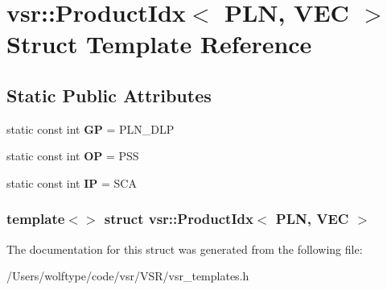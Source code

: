 \hypertarget{structvsr_1_1_product_idx_3_01_p_l_n_00_01_v_e_c_01_4}{\section{vsr\-:\-:Product\-Idx$<$ P\-L\-N, V\-E\-C $>$ Struct Template Reference}
\label{structvsr_1_1_product_idx_3_01_p_l_n_00_01_v_e_c_01_4}
}
\subsection*{Static Public Attributes}
\begin{DoxyCompactItemize}
\item 
\hypertarget{structvsr_1_1_product_idx_3_01_p_l_n_00_01_v_e_c_01_4_ae23085d7a902cf6c5b488ab3d5e30779}{static const int {\bfseries G\-P} = P\-L\-N\-\_\-\-D\-L\-P}\label{structvsr_1_1_product_idx_3_01_p_l_n_00_01_v_e_c_01_4_ae23085d7a902cf6c5b488ab3d5e30779}

\item 
\hypertarget{structvsr_1_1_product_idx_3_01_p_l_n_00_01_v_e_c_01_4_a25e009b3d1ed388af5c8e188a09b1f5f}{static const int {\bfseries O\-P} = P\-S\-S}\label{structvsr_1_1_product_idx_3_01_p_l_n_00_01_v_e_c_01_4_a25e009b3d1ed388af5c8e188a09b1f5f}

\item 
\hypertarget{structvsr_1_1_product_idx_3_01_p_l_n_00_01_v_e_c_01_4_a16a19649712103cdd77ed6991a770ef0}{static const int {\bfseries I\-P} = S\-C\-A}\label{structvsr_1_1_product_idx_3_01_p_l_n_00_01_v_e_c_01_4_a16a19649712103cdd77ed6991a770ef0}

\end{DoxyCompactItemize}
\subsubsection*{template$<$$>$ struct vsr\-::\-Product\-Idx$<$ P\-L\-N, V\-E\-C $>$}



The documentation for this struct was generated from the following file\-:\begin{DoxyCompactItemize}
\item 
/\-Users/wolftype/code/vsr/\-V\-S\-R/vsr\-\_\-templates.\-h\end{DoxyCompactItemize}
